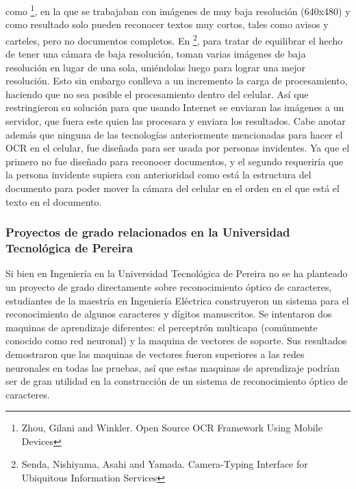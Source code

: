 \documentclass[a4paper, 11pt, oneside]{article}
\begin{document}
	como \footnote{Zhou, Gilani and Winkler. Open Source OCR Framework Using Mobile Devices}, 
	en la que se trabajaban con imágenes de muy baja resolución (640x480) y como resultado solo
    pueden reconocer textos muy cortos, tales como avisos
	y carteles,	pero no documentos completos.
	En \footnote{Senda, Nishiyama, Asahi and Yamada. Camera-Typing Interface for Ubiquitous
	Information Services}, para tratar de equilibrar el hecho de tener una cámara de baja
	resolución, toman varias imágenes de baja resolución en lugar de una sola, uniéndolas
	luego para lograr una mejor resolución. Esto sin embargo conlleva a un incremento la
	carga de procesamiento, haciendo que no sea posible el procesamiento dentro del celular.
	Así que restringieron su solución para que usando Internet se enviaran las imágenes a un
	servidor, que fuera este quien las procesara y enviara los resultados.\newline
	Cabe anotar además que ninguna de las tecnologías anteriormente mencionadas para hacer
	el OCR en el celular, fue diseñada para ser usada por personas invidentes. Ya que el 
	primero no fue diseñado para reconocer documentos, y el segundo requeriría que la persona
	invidente supiera con anterioridad como está la estructura del documento para poder mover
	la cámara del celular en el orden en el que está el texto en el documento.
	
	\subsubsection{Proyectos de grado relacionados en la Universidad Tecnológica de Pereira}
	Si bien en Ingeniería en la Universidad Tecnológica de Pereira no se ha planteado un proyecto 
    de grado directamente sobre reconocimiento óptico de caracteres, estudiantes de la maestría en
    Ingeniería Eléctrica construyeron un sistema para el reconocimiento de algunos caracteres 
    y dígitos manuscritos. Se intentaron dos maquinas de aprendizaje diferentes:
	el perceptrón multicapa (comúnmente conocido como red neuronal) y la maquina de vectores de
	soporte. Sus resultados demostraron que las maquinas de vectores fueron superiores a las redes
    neuronales en todas las pruebas, así que estas maquinas de aprendizaje podrían ser de gran 
    utilidad en la construcción de un sistema de reconocimiento óptico de caracteres.\newline
    
\end{document}
